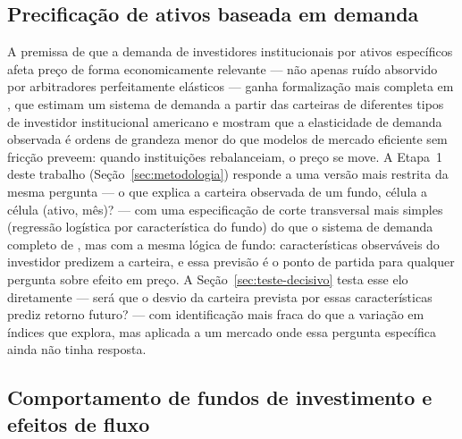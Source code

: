 \documentclass[11pt,a4paper]{article}
\begin{document}
\subsection{Precificação de ativos baseada em demanda}

A premissa de que a demanda de investidores institucionais por ativos específicos afeta preço de
forma economicamente relevante --- não apenas ruído absorvido por arbitradores perfeitamente
elásticos --- ganha formalização mais completa em , que estimam um sistema
de demanda a partir das carteiras de diferentes tipos de investidor institucional americano e
mostram que a elasticidade de demanda observada é ordens de grandeza menor do que modelos de
mercado eficiente sem fricção preveem: quando instituições rebalanceiam, o preço se move. A
Etapa~1 deste trabalho (Seção~\ref{sec:metodologia}) responde a uma versão mais restrita da mesma
pergunta --- o que explica a carteira observada de um fundo, célula a célula (ativo, mês)? ---
com uma especificação de corte transversal mais simples (regressão logística por característica
do fundo) do que o sistema de demanda completo de , mas com a mesma lógica
de fundo: características observáveis do investidor predizem a carteira, e essa previsão é o
ponto de partida para qualquer pergunta sobre efeito em preço. A Seção~\ref{sec:teste-decisivo}
testa esse elo diretamente --- será que o desvio da carteira prevista por essas características
prediz retorno futuro? --- com identificação mais fraca do que a variação em índices que
 explora, mas aplicada a um mercado onde essa pergunta específica ainda
não tinha resposta.

\subsection{Comportamento de fundos de investimento e efeitos de fluxo}
\end{document}
